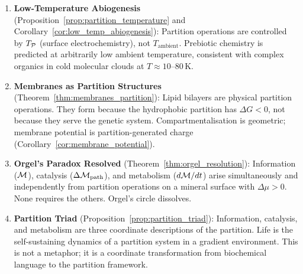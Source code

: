 \begin{chapterbox}[title=Chapter 6 --- Key Results Established]
\begin{enumerate}[label=\textbf{\arabic*.}]
  \item \textbf{Low-Temperature Abiogenesis} (Proposition~\ref{prop:partition_temperature}
        and Corollary~\ref{cor:low_temp_abiogenesis}): Partition operations
        are controlled by $T_{\mathcal{P}}$ (surface electrochemistry), not
        $T_{\mathrm{ambient}}$. Prebiotic chemistry is predicted at arbitrarily
        low ambient temperature, consistent with complex organics in cold
        molecular clouds at $T \approx 10$--$80\,\mathrm{K}$.

  \item \textbf{Membranes as Partition Structures} (Theorem~\ref{thm:membranes_partition}):
        Lipid bilayers are physical partition operations. They form because
        the hydrophobic partition has $\Delta G < 0$, not because they serve
        the genetic system. Compartmentalisation is geometric; membrane
        potential is partition-generated charge
        (Corollary~\ref{cor:membrane_potential}).

  \item \textbf{Orgel's Paradox Resolved} (Theorem~\ref{thm:orgel_resolution}):
        Information ($\mathcal{M}$), catalysis ($\Delta\mathcal{M}_{\mathrm{path}}$),
        and metabolism ($d\mathcal{M}/dt$) arise simultaneously and independently
        from partition operations on a mineral surface with $\Delta\mu > 0$.
        None requires the others. Orgel's circle dissolves.

  \item \textbf{Partition Triad} (Proposition~\ref{prop:partition_triad}):
        Information, catalysis, and metabolism are three coordinate descriptions
        of the partition. Life is the self-sustaining dynamics of a partition
        system in a gradient environment. This is not a metaphor; it is a
        coordinate transformation from biochemical language to the partition
        framework.
\end{enumerate}
\end{chapterbox}
